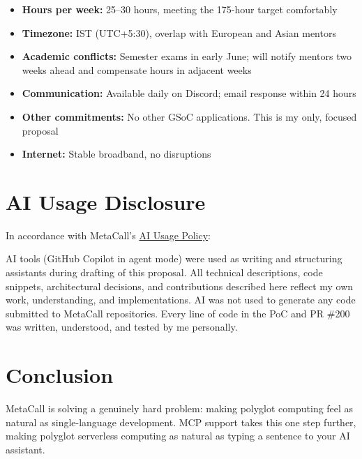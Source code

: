 \documentclass[12pt, a4paper]{article}
\begin{document}
\begin{itemize}[leftmargin=1.5em, itemsep=3pt]
  \item \textbf{Hours per week:} 25--30 hours, meeting
        the 175-hour target comfortably
  \item \textbf{Timezone:} IST (UTC+5:30), overlap with
        European and Asian mentors
  \item \textbf{Academic conflicts:} Semester exams in
        early June; will notify mentors two weeks ahead
        and compensate hours in adjacent weeks
  \item \textbf{Communication:} Available daily on Discord;
        email response within 24 hours
  \item \textbf{Other commitments:} No other GSoC
        applications. This is my only, focused proposal
  \item \textbf{Internet:} Stable broadband, no disruptions
\end{itemize}

\section{AI Usage Disclosure}

In accordance with MetaCall's
\href{https://github.com/metacall/gsoc-2026/blob/main/AI-USAGE-POLICY.md}%
{AI Usage Policy}:

\begin{infobox}
AI tools (GitHub Copilot in agent mode) were used as writing and
structuring assistants during drafting of this proposal. All technical
descriptions, code snippets, architectural decisions, and contributions
described here reflect my own work, understanding, and implementations.
AI was not used to generate any code submitted to MetaCall repositories.
Every line of code in the PoC and PR \#200 was written, understood, and
tested by me personally.
\end{infobox}

\section{Conclusion}

MetaCall is solving a genuinely hard problem: making polyglot computing
feel as natural as single-language development. MCP support takes this
one step further, making polyglot serverless computing as natural as
typing a sentence to your AI assistant.
\end{document}
